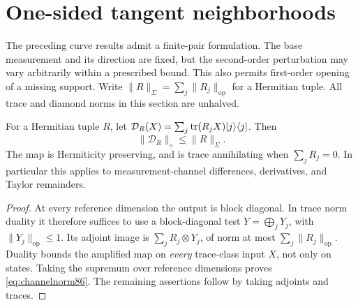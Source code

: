 \section{One-sided tangent neighborhoods}
\label{sec:tangentneighborhood86}
The preceding curve results admit a finite-pair formulation.  The
base measurement and its direction are fixed, but the second-order
perturbation may vary arbitrarily within a prescribed bound.  This
also permits first-order opening of a missing support.  Write
$\|R\|_{\Sigma}=\sum_j\|R_j\|_{\mathrm{op}}$ for a Hermitian tuple.
All trace and diamond norms in this section are unhalved.

\begin{lemma}\label{lem:channelnorm86}
For a Hermitian tuple $R$, let
$\mathcal D_R(X)=\sum_j\operatorname{tr}(R_jX)|j\rangle\langle j|$.
Then
\begin{equation}\label{eq:channelnorm86}
 \|\mathcal D_R\|_\diamond\le\|R\|_{\Sigma}.
\end{equation}
The map is Hermiticity preserving, and is trace annihilating when
$\sum_jR_j=0$.  In particular this applies to measurement-channel
differences, derivatives, and Taylor remainders.
\end{lemma}
\begin{proof}
At every reference dimension the output is block diagonal.  In trace
norm duality it therefore suffices to use a block-diagonal test
$Y=\bigoplus_jY_j$, with $\|Y_j\|_{\mathrm{op}}\le1$.  Its adjoint
image is $\sum_jR_j\otimes Y_j$, of norm at most
$\sum_j\|R_j\|_{\mathrm{op}}$.  Duality bounds the amplified map on
\emph{every} trace-class input $X$, not only on states.  Taking the
supremum over reference dimensions proves \eqref{eq:channelnorm86}.
The remaining assertions follow by taking adjoints and traces.
\end{proof}

